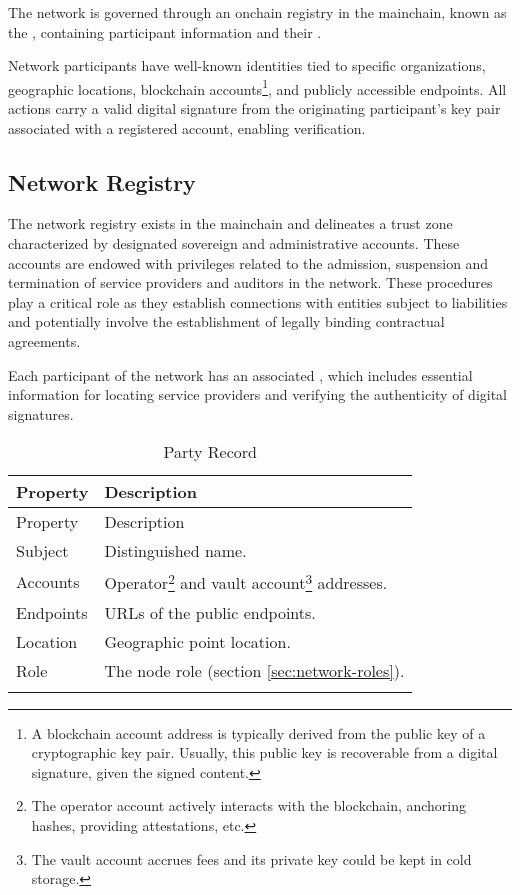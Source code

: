 \documentclass{oc}
\begin{document}
The network is governed through an onchain registry in the \gls{mainchain}, known as the , containing participant information and their .

Network participants have well-known identities tied to specific organizations, geographic locations, blockchain accounts\footnote{
  A blockchain account address is typically derived from the public key of a cryptographic key pair.
  Usually, this public key is recoverable from a digital signature, given the signed content.
}, and publicly accessible endpoints.
All actions carry a valid digital signature from the originating participant's key pair associated with a registered account, enabling verification.

\subsection{Network Registry}\label{sec:network-registry}

The network registry exists in the \gls{mainchain} and delineates a trust zone characterized by designated sovereign and administrative accounts.
These accounts are endowed with privileges related to the admission, suspension and termination of service providers and auditors in the network.
These procedures play a critical role as they establish connections with entities subject to liabilities and potentially involve the establishment of legally binding contractual agreements.

Each participant of the network has an associated , which includes essential information for locating service providers and verifying the authenticity of digital signatures.

\begin{xltabular}{\linewidth}{ l  X }
  \caption{Party Record} 
  \label{table:party-record}\\
  \toprule
   Property & Description  \\
  \midrule
  \endfirsthead
   Property & Description  \\
  \midrule
  \endhead
  \bottomrule
  \endfoot
  
  Subject &  Distinguished name\cite{x510}. \\ \addlinespace

  Accounts & Operator\footnote{
    The operator account actively interacts with the blockchain, anchoring hashes, providing attestations, etc.
  } and vault account\footnote{
    The vault account accrues fees and its private key could be kept in cold storage.
  } addresses. \\ \addlinespace
    
  Endpoints & URLs\cite{rfc3986} of the public endpoints. \\  \addlinespace
  
  Location & Geographic point location\cite{iso6709}. \\  \addlinespace
    
  Role & The node role (section \ref{sec:network-roles}). \\ \addlinespace
  
\end{xltabular}
\end{document}
